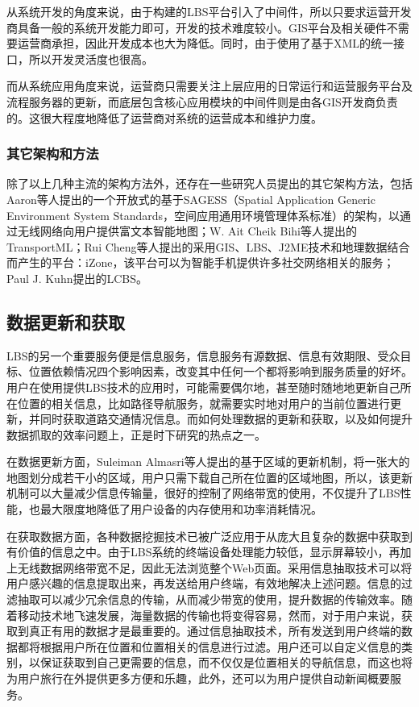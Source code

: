 \documentclass{article}
\begin{document}
\begin{CJK}{UTF8}{gbsn}
	从系统开发的角度来说，由于构建的LBS平台引入了中间件，所以只要求运营开发商具备一般的系统开发能力即可，开发的技术难度较小。GIS平台及相关硬件不需要运营商承担，因此开发成本也大为降低。同时，由于使用了基于XML的统一接口，所以开发灵活度也很高。

	而从系统应用角度来说，运营商只需要关注上层应用的日常运行和运营服务平台及流程服务器的更新，而底层包含核心应用模块的中间件则是由各GIS开发商负责的。这很大程度地降低了运营商对系统的运营成本和维护力度。

	\subsubsection{其它架构和方法}
  除了以上几种主流的架构方法外，还存在一些研究人员提出的其它架构方法，包括Aaron等人提出的一个开放式的基于SAGESS（Spatial Application Generic Environment System Standards，空间应用通用环境管理体系标准）的架构，以通过无线网络向用户提供富文本智能地图\cite{L05}；W. Ait Cheik Bihi等人提出的TransportML\cite{L03}；Rui Cheng等人提出的采用GIS、LBS、J2ME技术和地理数据结合而产生的平台：iZone，该平台可以为智能手机提供许多社交网络相关的服务\cite{L11}；Paul J. Kuhn提出的LCBS\cite{L04}。


	\subsection{数据更新和获取}
  LBS的另一个重要服务便是信息服务，信息服务有源数据、信息有效期限、受众目标、位置依赖情况四个影响因素\cite{D06}，改变其中任何一个都将影响到服务质量的好坏。用户在使用提供LBS技术的应用时，可能需要偶尔地，甚至随时随地地更新自己所在位置的相关信息，比如路径导航服务，就需要实时地对用户的当前位置进行更新，并同时获取道路交通情况信息。而如何处理数据的更新和获取，以及如何提升数据抓取的效率问题上，正是时下研究的热点之一。
   
  在数据更新方面，Suleiman Almasri等人提出的基于区域的更新机制\cite{L12}，将一张大的地图划分成若干小的区域，用户只需下载自己所在位置的区域地图，所以，该更新机制可以大量减少信息传输量，很好的控制了网络带宽的使用，不仅提升了LBS性能，也最大限度地降低了用户设备的内存使用和功率消耗情况。

  在获取数据方面，各种数据挖掘技术已被广泛应用于从庞大且复杂的数据中获取到有价值的信息之中\cite{D09}。由于LBS系统的终端设备处理能力较低，显示屏幕较小，再加上无线数据网络带宽不足，因此无法浏览整个Web页面。采用信息抽取技术可以将用户感兴趣的信息提取出来，再发送给用户终端，有效地解决上述问题\cite{D11}。信息的过滤抽取可以减少冗余信息的传输，从而减少带宽的使用，提升数据的传输效率。随着移动技术地飞速发展，海量数据的传输也将变得容易，然而，对于用户来说，获取到真正有用的数据才是最重要的。通过信息抽取技术，所有发送到用户终端的数据都将根据用户所在位置和位置相关的信息进行过滤。用户还可以自定义信息的类别，以保证获取到自己更需要的信息，而不仅仅是位置相关的导航信息，而这也将为用户旅行在外提供更多方便和乐趣\cite{D10}，此外，还可以为用户提供自动新闻概要服务\cite{D02}。


\end{CJK}
\end{document}
